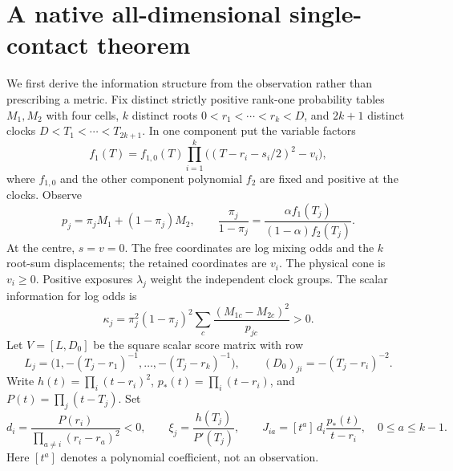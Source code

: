 \documentclass[11pt,reqno]{amsart}
\numberwithin{equation}{section}
\theoremstyle{definition}\newtheorem{definition}[theorem]{Definition}
\theoremstyle{remark}\newtheorem{remark}[theorem]{Remark}
\begin{document}
\section{A native all-dimensional single-contact theorem}\label{sec:realization}
We first derive the information structure from the observation rather than prescribing a metric. Fix distinct strictly positive rank-one probability tables $M_1,M_2$ with four cells, $k$ distinct roots $0<r_1<\cdots<r_k<D$, and $2k+1$ distinct clocks $D<T_1<\cdots<T_{2k+1}$. In one component put the variable factors
\[
 f_1(T)=f_{1,0}(T)\prod_{i=1}^k\big((T-r_i-s_i/2)^2-v_i\big),
\]
where $f_{1,0}$ and the other component polynomial $f_2$ are fixed and positive at the clocks. Observe
\begin{equation}\label{eq:binary}
 p_j=\pi_jM_1+(1-\pi_j)M_2,\qquad
 \frac{\pi_j}{1-\pi_j}=\frac{\alpha f_1(T_j)}{(1-\alpha)f_2(T_j)}.
\end{equation}
At the centre, $s=v=0$. The free coordinates are log mixing odds and the $k$ root-sum displacements; the retained coordinates are $v_i$. The physical cone is $v_i\ge0$. Positive exposures $\lambda_j$ weight the independent clock groups. The scalar information for log odds is
\[
 \kappa_j=\pi_j^2(1-\pi_j)^2\sum_c\frac{(M_{1c}-M_{2c})^2}{p_{jc}}>0.
\]
Let $V=[L,D_0]$ be the square scalar score matrix with row
\[
 L_j=\big(1,-(T_j-r_1)^{-1},\ldots,-(T_j-r_k)^{-1}\big),\qquad
 (D_0)_{ji}=-(T_j-r_i)^{-2}.
\]
Write $h(t)=\prod_i(t-r_i)^2$, $p_*(t)=\prod_i(t-r_i)$, and $P(t)=\prod_j(t-T_j)$. Set
\begin{equation}\label{eq:J}
 d_i=\frac{P(r_i)}{\prod_{a\ne i}(r_i-r_a)^2}<0,\qquad
 \xi_j=\frac{h(T_j)}{P'(T_j)},\qquad
 J_{ia}=[t^a]\,d_i\frac{p_*(t)}{t-r_i},\quad 0\le a\le k-1.
\end{equation}
Here $[t^a]$ denotes a polynomial coefficient, not an observation.
\end{document}
